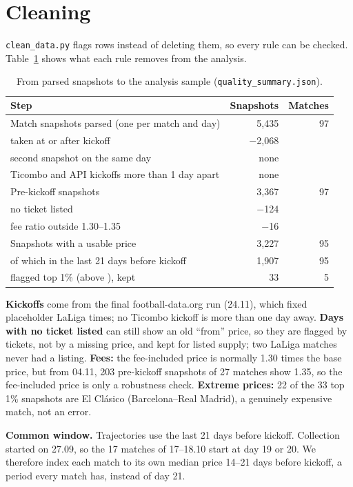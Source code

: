 \documentclass[11pt,a4paper]{article}
\newcommand{\eur}{\texteuro}
\begin{document}
\section{Cleaning}

\texttt{clean\_data.py} flags rows instead of deleting them, so every rule can be checked. Table~\ref{tab:cleaning} shows what each rule removes from the analysis.

\begin{table}[htbp]
\centering
\caption{From parsed snapshots to the analysis sample (\texttt{quality\_summary.json}).}
\label{tab:cleaning}
\begin{tabular}{lrr}
\toprule
Step & Snapshots & Matches \\
\midrule
Match snapshots parsed (one per match and day) & 5,435 & 97 \\
\quad taken at or after kickoff & $-$2,068 & \\
\quad second snapshot on the same day & none & \\
\quad Ticombo and API kickoffs more than 1 day apart & none & \\
Pre-kickoff snapshots & 3,367 & 97 \\
\quad no ticket listed & $-$124 & \\
\quad fee ratio outside 1.30--1.35 & $-$16 & \\
Snapshots with a usable price & 3,227 & 95 \\
\quad of which in the last 21 days before kickoff & 1,907 & 95 \\
\quad flagged top 1\% (above \eur 897.40), kept & 33 & 5 \\
\bottomrule
\end{tabular}
\end{table}

\textbf{Kickoffs} come from the final football-data.org run (24.11), which fixed placeholder LaLiga times; no Ticombo kickoff is more than one day away. \textbf{Days with no ticket listed} can still show an old ``from'' price, so they are flagged by tickets, not by a missing price, and kept for listed supply; two LaLiga matches never had a listing. \textbf{Fees:} the fee-included price is normally 1.30 times the base price, but from 04.11, 203 pre-kickoff snapshots of 27 matches show 1.35, so the fee-included price is only a robustness check. \textbf{Extreme prices:} 22 of the 33 top 1\% snapshots are El Cl\'asico (Barcelona--Real Madrid), a genuinely expensive match, not an error.

\textbf{Common window.} Trajectories use the last 21 days before kickoff. Collection started on 27.09, so the 17 matches of 17--18.10 start at day 19 or 20. We therefore index each match to its own median price 14--21 days before kickoff, a period every match has, instead of day 21.
\end{document}
